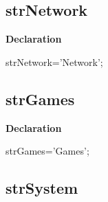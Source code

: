 \documentclass{report}
\newif\ifpdf
\begin{document}
\subsection*{strNetwork}
\fi
\label{trstrings-strNetwork}
\begin{list}{}{
\setlength{\itemindent}{0cm}
\setlength{\listparindent}{0cm}
\setlength{\leftmargin}{\evensidemargin}
\addtolength{\leftmargin}{\tmplength}
\settowidth{\labelsep}{X}
\addtolength{\leftmargin}{\labelsep}
\setlength{\labelwidth}{\tmplength}
}
\item[\textbf{Declaration}\hfill]
\ifpdf
\begin{flushleft}
\fi
\begin{ttfamily}
strNetwork='Network';\end{ttfamily}

\ifpdf
\end{flushleft}
\fi

\end{list}
\ifpdf
\subsection*{\large{\textbf{strGames}}\normalsize\hspace{1ex}\hrulefill}
\else
\subsection*{strGames}
\fi
\label{trstrings-strGames}
\begin{list}{}{
\setlength{\itemindent}{0cm}
\setlength{\listparindent}{0cm}
\setlength{\leftmargin}{\evensidemargin}
\addtolength{\leftmargin}{\tmplength}
\settowidth{\labelsep}{X}
\addtolength{\leftmargin}{\labelsep}
\setlength{\labelwidth}{\tmplength}
}
\item[\textbf{Declaration}\hfill]
\ifpdf
\begin{flushleft}
\fi
\begin{ttfamily}
strGames='Games';\end{ttfamily}

\ifpdf
\end{flushleft}
\fi

\end{list}
\ifpdf
\subsection*{\large{\textbf{strSystem}}\normalsize\hspace{1ex}\hrulefill}
\else
\end{document}
